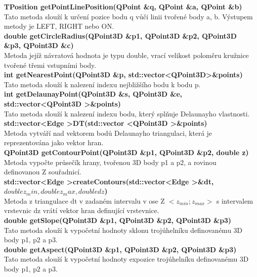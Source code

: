 \documentclass[a4paper, 12pt]{article}
\begin{document}
\textbf{TPosition getPointLinePosition(QPoint \&q, QPoint \&a, QPoint \&b)}\\
Tato metoda slouží k určení pozice bodu q vůči linii tvořené body a, b. Výstupem metody je LEFT, RIGHT nebo ON.\\

\textbf{double getCircleRadius(QPoint3D \&p1, QPoint3D \&p2, QPoint3D \&p3, QPoint3D \&c)}\\
Metoda jejíž návratová hodnota je typu double, vrací velikost poloměru kružnice tvořené třemi vstupními body.\\

\textbf{int getNearestPoint(QPoint3D \&p, std::vector\textless QPoint3D\textgreater \&points)}\\
Tato metoda slouží k nalezení indexu nejbližšího bodu k bodu p.\\

\textbf{int getDelaunayPoint(QPoint3D \&s, QPoint3D \&e, std::vector\textless QPoint3D \textgreater \&points)}\\
Tato metoda slouží k nalezení indexu bodu, který splňuje Delaunayho vlastnosti.\\

\textbf{std::vector\textless Edge \textgreater DT(std::vector \textless QPoint3D \textgreater \&points)}\\
Metoda vytváří nad vektorem bodů Delaunayho triangulaci, která je reprezentována jako vektor hran.\\

\textbf{QPoint3D getContourPoint(QPoint3D \&p1, QPoint3D \&p2, double z)}\\
Metoda vypočte průsečík hrany, tvořenou 3D body p1 a p2, a rovinou definovanou Z souřadnicí.\\

\textbf{std::vector\textless Edge \textgreater createContours(std::vector\textless Edge \textgreater \&dt, $double z_min, double z_max, double dz$)}\\
Metoda z triangulace dt v zadaném intervalu v ose Z $<z_{min} ; z_{max}>$ s intervalem vrstevnic dz vrátí vektor hran definující vrstevnice.\\

\textbf{double getSlope(QPoint3D \&p1, QPoint3D \&p2, QPoint3D \&p3)}\\
Tato metoda slouží k vypočetní hodnoty sklonu trojúhelníku definovanému 3D body p1, p2 a p3.\\

\textbf{double getAspect(QPoint3D \&p1, QPoint3D \&p2, QPoint3D \&p3)}\\
Tato metoda slouží k vypočetní hodnoty expozice trojúhelníku definovanému 3D body p1, p2 a p3.\\
\end{document}

